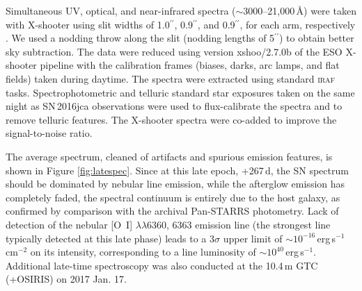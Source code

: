 \documentclass[fleqn,usenatbib]{mnras}
\begin{document}
Simultaneous UV, optical, and near-infrared spectra ($\sim 3000$--21,000\,\AA) were taken with X-shooter using slit widths
of 1.0$^{\prime\prime}$,  0.9$^{\prime\prime}$, and 0.9$^{\prime\prime}$, for each arm, respectively \citep{DOdorico06}. We used a nodding throw along the slit (nodding lengths of 5$^{\prime\prime}$) to obtain better sky subtraction. The data were reduced using version xshoo/2.7.0b of the ESO X-shooter pipeline \citep{Modigliani10} with the calibration frames (biases, darks, arc lamps, and flat fields) taken during daytime. 
The spectra were extracted using standard \textsc{iraf} tasks. Spectrophotometric and telluric standard star exposures taken on the same night as SN\,2016jca observations were used to flux-calibrate the  spectra and to remove telluric features. 
The X-shooter spectra  were co-added to improve the signal-to-noise ratio. 

The average spectrum, cleaned of artifacts and spurious emission features, is shown in Figure \ref{fig:latespec}. Since at this late epoch, +267\,d, the SN spectrum should be dominated by nebular  line emission, while the afterglow emission has completely faded, the spectral continuum is entirely due to the host galaxy, as confirmed by comparison with the archival Pan-STARRS photometry. Lack of detection of the nebular [O~I] $\lambda\lambda$6360, 6363 emission line (the strongest line typically detected at this late phase) leads to a 3$\sigma$ upper limit of $\sim  10^{-16}$\,erg\,s$^{-1}$\,cm$^{-2}$ on its intensity, corresponding to a line luminosity of $\sim 10^{40}$\,erg\,s$^{-1}$. Additional late-time spectroscopy was also conducted at the 10.4\,m GTC (+OSIRIS) on 2017 Jan. 17.
\end{document}
